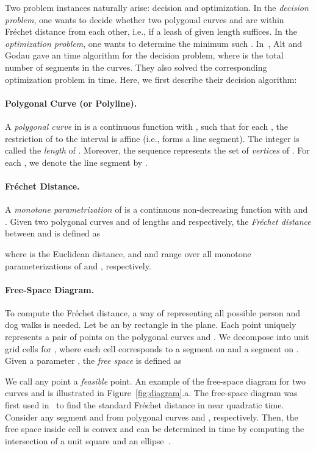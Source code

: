 \documentclass[12pt]{dalthesis}
\newcommand{\Frechet}{Fr\'echet }
\begin{document}
Two problem instances naturally arise:  decision and optimization.
In the {\em decision problem}, one wants to decide whether two polygonal curves   and 
are within  \Frechet distance from each other, i.e., if a leash of given length  suffices.
In the {\em optimization problem}, one wants to determine the minimum such .
In~\cite{AltG95}, Alt and Godau gave an  
time algorithm for the decision problem,
where  is the total number of segments in the curves.
They also solved the corresponding optimization problem in  time.
Here, we first describe their decision algorithm:


\paragraph{Polygonal Curve (or Polyline).}
A {\em polygonal curve\/} in  is  a continuous function 
 with , 
such that for each ,
the restriction of  to the interval  
is affine (i.e., forms a line segment).
The integer  is called the {\em length\/} of .
Moreover, the sequence  represents the set of {\em vertices\/} of .
For each , 
we denote the line segment  by .




\paragraph{\Frechet Distance.}

A {\em monotone parametrization} of  
is a continuous non-decreasing function 
with  and .
Given two polygonal curves  and  of lengths  and  respectively, 
the {\em \Frechet distance\/} between  and  is defined as

where  is the Euclidean  distance, and  and  range over all monotone parameterizations of 
 and , respectively.


\paragraph{Free-Space Diagram.}
To compute the \Frechet distance, a way of representing all possible 
person and dog walks is needed.
Let  be an  by  rectangle  in the plane.
Each point  uniquely represents a pair of points
 on the polygonal curves  and .
We decompose  into
 unit grid cells 
for ,
where each cell  corresponds to
a segment  on  and a segment  on .
Given a parameter ,
the {\em free space\/}  is defined as

We call any point  a {\em feasible\/} point.
An example of the free-space diagram for two curves  and  
is illustrated in Figure~\ref{fig:diagram}.a.
The free-space diagram was first used in~\cite{AltG95}
to find the standard \Frechet distance in near quadratic time.
Consider any segment  and  from polygonal curves  and , 
respectively. Then, the free space inside cell  is convex 
and can be determined in  time by computing the intersection of a unit square and an ellipse~\cite{AltG95}.
\end{document}
